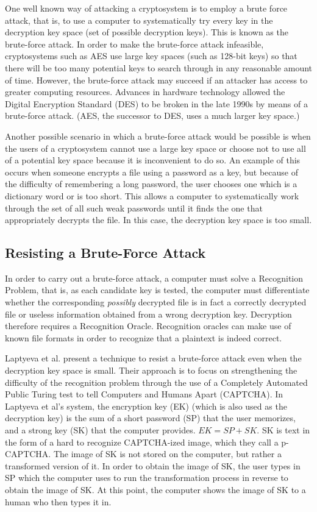 \documentclass[12pt]{article}
\begin{document}
	One well known way of attacking a cryptosystem is to employ a brute force attack, that is, to use a computer to systematically try every key in the decryption key space (set of possible decryption keys). This is known as the brute-force attack. In order to make the brute-force attack infeasible, cryptosystems such as AES use large key spaces (such as 128-bit keys) so that there will be too many potential keys to search through in any reasonable amount of time. However, the brute-force attack may succeed if an attacker has access to greater computing resources. Advances in hardware technology allowed the Digital Encryption Standard (DES) to be broken in the late 1990s by means of a brute-force attack. (AES, the successor to DES, uses a much larger key space.)

	Another possible scenario in which a brute-force attack would be possible is when the users of a cryptosystem cannot use a large key space or choose not to use all of a potential key space because it is inconvenient to do so. An example of this occurs when someone encrypts a file using a password as a key, but because of the difficulty of remembering a long password, the user chooses one which is a dictionary word or is too short. This allows a computer to systematically work through the set of all such weak passwords until it finds the one that appropriately decrypts the file. In this case, the decryption key space is too small.

\subsection*{Resisting a Brute-Force Attack}
In order to carry out a brute-force attack, a computer must solve a Recognition Problem, that is, as each candidate key is tested, the computer must differentiate whether the corresponding \emph{possibly} decrypted file is in fact a correctly decrypted file or useless information obtained from a wrong decryption key. Decryption therefore requires a Recognition Oracle. Recognition oracles can make use of known file formats in order to recognize that a plaintext is indeed correct.

	Laptyeva et al. \cite{laptyeva} present a technique to resist a brute-force attack even when the decryption key space is small. Their approach is to focus on strengthening the difficulty of the recognition problem through the use of a Completely Automated Public Turing test to tell Computers and Humans Apart (CAPTCHA). In Laptyeva et al's system, the encryption key (EK) (which is also used as the decryption key) is the sum of a short password (SP) that the user memorizes, and a strong key (SK) that the computer provides. $EK = SP + SK$. SK is text in the form of a hard to recognize CAPTCHA-ized image, which they call a p-CAPTCHA. The image of SK is not stored on the computer, but rather a transformed version of it. In order to obtain the image of SK, the user types in SP which the computer uses to run the transformation process in reverse to obtain the image of SK. At this point, the computer shows the image of SK to a human who then types it in.
\end{document}

